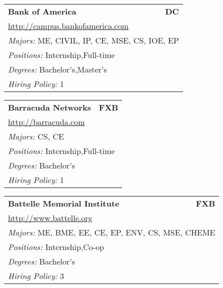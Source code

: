 \documentclass[twoside]{article}
\begin{document}
\begin{center}
\begin{multicols}{3}
\begin{FlushLeft}
\begin{minipage}{.9\columnwidth}
\end{minipage}
 
\begin{minipage}{.9\columnwidth}\begin{tabularx}{.95\columnwidth}{Xr}
                 {\Large\bf Bank of America} & {\Large\bf DC}\\
    \multicolumn{2}{p{.95\columnwidth}}{\url{http://campus.bankofamerica.com}}\\
    \multicolumn{2}{p{.95\columnwidth}}{\emph{Majors:} ME, CIVIL, IP, CE, MSE, CS, IOE, EP}\\
    \multicolumn{2}{p{.95\columnwidth}}{\emph{Positions:} Internship,Full-time}\\
    \multicolumn{2}{p{.95\columnwidth}}{\emph{Degrees:} Bachelor's,Master's}\\
    \multicolumn{2}{p{.95\columnwidth}}{\emph{Hiring Policy:} 1}\\
    \end{tabularx}
    
\end{minipage}
 
\begin{minipage}{.9\columnwidth}\begin{tabularx}{.95\columnwidth}{Xr}
                 {\Large\bf Barracuda Networks} & {\Large\bf FXB}\\
    \multicolumn{2}{p{.95\columnwidth}}{\url{http://barracuda.com}}\\
    \multicolumn{2}{p{.95\columnwidth}}{\emph{Majors:} CS, CE}\\
    \multicolumn{2}{p{.95\columnwidth}}{\emph{Positions:} Internship,Full-time}\\
    \multicolumn{2}{p{.95\columnwidth}}{\emph{Degrees:} Bachelor's}\\
    \multicolumn{2}{p{.95\columnwidth}}{\emph{Hiring Policy:} 1}\\
    \end{tabularx}
    
\end{minipage}
 
\begin{minipage}{.9\columnwidth}\begin{tabularx}{.95\columnwidth}{Xr}
                 {\Large\bf Battelle Memorial Institute} & {\Large\bf FXB}\\
    \multicolumn{2}{p{.95\columnwidth}}{\url{http://www.battelle.org}}\\
    \multicolumn{2}{p{.95\columnwidth}}{\emph{Majors:} ME, BME, EE, CE, EP, ENV, CS, MSE, CHEME}\\
    \multicolumn{2}{p{.95\columnwidth}}{\emph{Positions:} Internship,Co-op}\\
    \multicolumn{2}{p{.95\columnwidth}}{\emph{Degrees:} Bachelor's}\\
    \multicolumn{2}{p{.95\columnwidth}}{\emph{Hiring Policy:} 3}\\
    \end{tabularx}
    

\end{minipage}
\end{FlushLeft}
\end{multicols}
\end{center}
\end{document}
